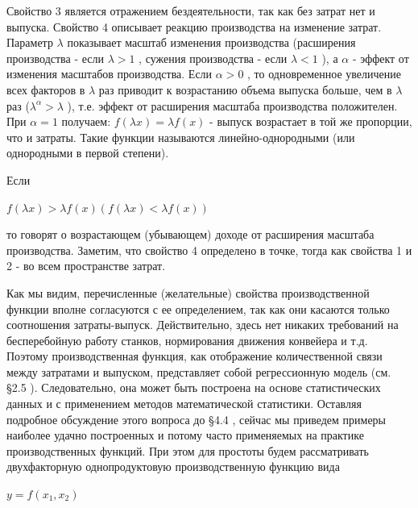 \documentclass[12pt, 4paper]{book}
\begin{document}
{Свойство 3 является отражением бездеятельности, так как без затрат нет и выпуска. Свойство 4 описывает реакцию производства на изменение затрат. Параметр $\lambda$ показывает масштаб изменения производства (расширения производства - если $\lambda > 1$ , сужения производства - если $\lambda < 1$ ), а $\alpha$ - эффект от изменения масштабов производства. Если $\alpha > 0$ , то одновременное увеличение всех факторов в $\lambda$ раз приводит к возрастанию объема выпуска больше, чем в $\lambda$ раз ($\lambda^{\alpha} > \lambda$ ), т.е. эффект от расширения масштаба производства положителен. При $\alpha =1$ получаем: $f(\lambda x)= \lambda f(x)$ - выпуск возрастает в той же пропорции, что и затраты. Такие функции называются линейно-однородными (или однородными в первой степени).
\par

Если 
\begin{center}
$f(\lambda x)>\lambda f(x) (f (\lambda x)< \lambda f(x))$
\end{center}
то говорят о возрастающем (убывающем) доходе от расширения масштаба производства. Заметим, что свойство 4 определено в точке, тогда как свойства 1 и 2 - во всем пространстве затрат. 
\par

Как мы видим, перечисленные (желательные) свойства производственной функции вполне согласуются с ее определением, так как они касаются только соотношения затраты-выпуск. Действительно, здесь нет никаких требований на бесперебойную работу станков, нормирования движения конвейера и т.д. Поэтому производственная функция, как отображение количественной связи между затратами и выпуском, представляет собой регрессионную модель (см. §2.5 ). Следовательно, она может быть построена на основе статистических данных и с применением методов математической статистики. Оставляя подробное обсуждение этого вопроса до §4.4 , сейчас мы приведем примеры наиболее удачно построенных и потому часто применяемых на практике производственных функций. При этом для простоты будем рассматривать двухфакторную однопродуктовую производственную функцию вида 
\begin{center}
$y = f(x_1,x_2)$
\end{center}
\par

}
\end{document}

